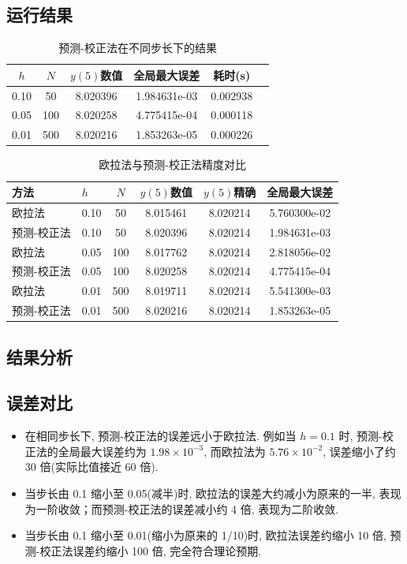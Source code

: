 \documentclass[12pt,a4paper]{ctexart}
\begin{document}
\subsection{运行结果}
\begin{table}[H]
    \centering
    \caption{预测-校正法在不同步长下的结果}
    \begin{tabular}{@{}cccccc@{}}
        \toprule
        $h$ & $N$ & $y(5)$数值 & 全局最大误差 & 耗时(s) \\
        \midrule
        0.10 & 50  & 8.020396 & 1.984631e-03 & 0.002938 \\
        0.05 & 100 & 8.020258 & 4.775415e-04 & 0.000118 \\
        0.01 & 500 & 8.020216 & 1.853263e-05 & 0.000226 \\
        \bottomrule
    \end{tabular}
\end{table}
\begin{table}[H]
    \centering
    \caption{欧拉法与预测-校正法精度对比}
    \begin{tabular}{@{}llcccc@{}}
        \toprule
        方法 & $h$ & $N$ & $y(5)$数值 & $y(5)$精确 & 全局最大误差 \\
        \midrule
        欧拉法      & 0.10 & 50  & 8.015461 & 8.020214 & 5.760300e-02 \\
        预测-校正法 & 0.10 & 50  & 8.020396 & 8.020214 & 1.984631e-03 \\
        \midrule
        欧拉法      & 0.05 & 100 & 8.017762 & 8.020214 & 2.818056e-02 \\
        预测-校正法 & 0.05 & 100 & 8.020258 & 8.020214 & 4.775415e-04 \\
        \midrule
        欧拉法      & 0.01 & 500 & 8.019711 & 8.020214 & 5.541300e-03 \\
        预测-校正法 & 0.01 & 500 & 8.020216 & 8.020214 & 1.853263e-05 \\
        \bottomrule
    \end{tabular}
\end{table}

\subsection{结果分析}

\subsection*{误差对比}
\begin{itemize}
    \item 在相同步长下, 预测-校正法的误差远小于欧拉法. 例如当 $h=0.1$ 时, 预测-校正法的全局最大误差约为 $1.98\times10^{-3}$, 而欧拉法为 $5.76\times10^{-2}$, 误差缩小了约 30 倍(实际比值接近 60 倍). 
    \item 当步长由 0.1 缩小至 0.05(减半)时, 欧拉法的误差大约减小为原来的一半, 表现为一阶收敛；而预测-校正法的误差减小约 4 倍, 表现为二阶收敛. 
    \item 当步长由 0.1 缩小至 0.01(缩小为原来的 1/10)时, 欧拉法误差约缩小 10 倍, 预测-校正法误差约缩小 100 倍, 完全符合理论预期. 
\end{itemize}
\end{document}
